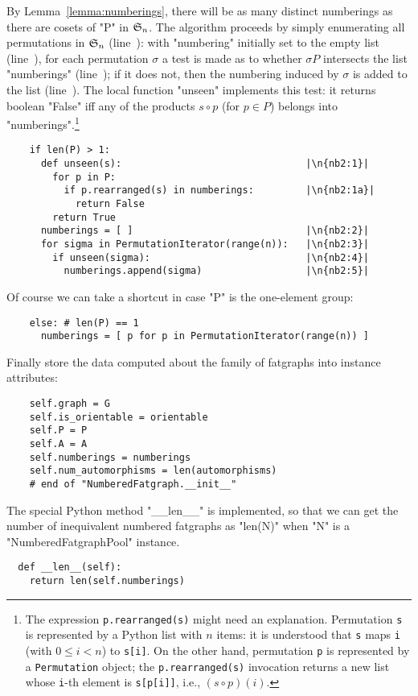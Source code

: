 By Lemma~\ref{lemma:numberings}, there will be as many distinct
numberings as there are cosets of "P" in $\mathfrak{S}_{n}$.  The algorithm
proceeds by simply enumerating all permutations in $\mathfrak{S}_{n}$
(line~): with "numbering" initially set to the empty list
(line~), for each permutation $\sigma$ a test is made as to
whether $\sigma P$ intersects the list "numberings" (line~);
if it does not, then the numbering induced by $\sigma$ is added to the
list (line~).  The local function "unseen" implements this
test: it returns boolean "False" iff any of the products $s \circ p$
(for $p \in P$) belongs into "numberings".\footnote{The expression
  \Verb`p.rearranged(s)` might need an explanation.  Permutation
  \Verb`s` is represented by a Python list with $n$ items: it is
  understood that \Verb`s` maps \Verb`i` (with $0 \leq i < n$) to
  \Verb`s[i]`.  On the other hand, permutation \Verb`p` is represented
  by a \Verb`Permutation` object; the \Verb`p.rearranged(s)`
  invocation returns a new list whose \Verb`i`-th element is
  \Verb`s[p[i]]`, i.e., $(s \circ p) (i)$.}
\begin{lstlisting}
    if len(P) > 1:
      def unseen(s):                                |\n{nb2:1}| 
        for p in P:
          if p.rearranged(s) in numberings:         |\n{nb2:1a}|
            return False
        return True
      numberings = [ ]                              |\n{nb2:2}|
      for sigma in PermutationIterator(range(n)):   |\n{nb2:3}|
        if unseen(sigma):                           |\n{nb2:4}|
          numberings.append(sigma)                  |\n{nb2:5}|

\end{lstlisting}
Of course we can take a shortcut in case "P" is the one-element group:
\begin{lstlisting}
    else: # len(P) == 1
      numberings = [ p for p in PermutationIterator(range(n)) ]

\end{lstlisting}

Finally store the data computed about the family of fatgraphs into
instance attributes:
\begin{lstlisting}
    self.graph = G
    self.is_orientable = orientable
    self.P = P
    self.A = A
    self.numberings = numberings
    self.num_automorphisms = len(automorphisms)
    # end of "NumberedFatgraph.__init__"

\end{lstlisting}

The special Python method "__len__" is implemented, so that we can get
the number of inequivalent numbered fatgraphs as "len(N)" when "N" is
a "NumberedFatgraphPool" instance.
\begin{lstlisting}
  def __len__(self):
    return len(self.numberings)

\end{lstlisting}

